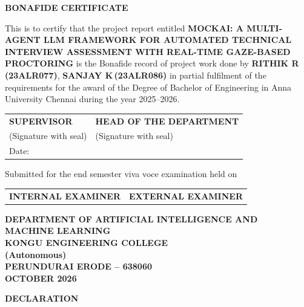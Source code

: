 \documentclass[12pt,a4paper]{report}
\begin{document}
\vspace{1.5cm}
\begin{center}
{\large\bfseries BONAFIDE CERTIFICATE}
\end{center}

\vspace{0.8cm}
\noindent This is to certify that the project report entitled \textbf{MOCKAI: A MULTI-AGENT LLM
FRAMEWORK FOR AUTOMATED TECHNICAL INTERVIEW ASSESSMENT
WITH REAL-TIME GAZE-BASED PROCTORING} is the Bonafide record of project
work done by \textbf{RITHIK R\,(23ALR077)}, \textbf{SANJAY K\,(23ALR086)} in partial
fulfilment of the requirements for the award of the Degree of Bachelor of Engineering in
Anna University Chennai during the year 2025--2026.

\vspace{2.5cm}
\noindent\begin{tabular}{@{}p{7cm}@{}p{7cm}@{}}
\textbf{SUPERVISOR} & \textbf{HEAD OF THE DEPARTMENT}\\[0.3cm]
(Signature with seal) & (Signature with seal)\\[2cm]
Date:\underline{\hspace{3cm}} &
\end{tabular}

\vspace{1.5cm}
\noindent Submitted for the end semester viva voce examination held on
\underline{\hspace{5cm}}

\vspace{2.5cm}
\noindent\begin{tabular}{@{}p{7cm}@{}p{7cm}@{}}
\textbf{INTERNAL EXAMINER} & \textbf{EXTERNAL EXAMINER}
\end{tabular}

\clearpage
\thispagestyle{plain}
\begin{center}
{\large\bfseries DEPARTMENT OF ARTIFICIAL INTELLIGENCE AND\\
MACHINE LEARNING\\
KONGU ENGINEERING COLLEGE\\
(Autonomous)\\
PERUNDURAI ERODE -- 638060\\
OCTOBER 2026}
\end{center}

\vspace{1.2cm}
\begin{center}
{\large\bfseries DECLARATION}
\end{center}
\end{document}
